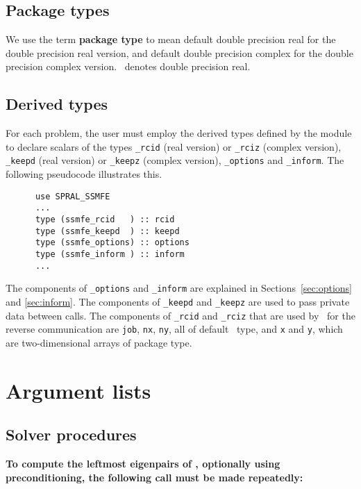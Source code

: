 \documentclass{spral}
\begin{document}
\subsection{Package types} 

We use the term {\bf package type} to mean
default double precision real for the double precision real version,
and default double precision complex
for the double precision complex version. 
\REALDP\
denotes double precision real.

\subsection{Derived types}
\label{derived types}
For each problem, the user must employ the derived types defined by the
module to declare scalars of the types 
{\tt \solver\_rcid} (real version) or 
{\tt \solver\_rciz} (complex version), 
{\tt \solver\_keepd} (real version) or
{\tt \solver\_keepz} (complex version),
{\tt \solver\_options} and 
{\tt \solver\_inform}.
The following pseudocode illustrates this.
\begin{verbatim}
      use SPRAL_SSMFE    
      ...
      type (ssmfe_rcid   ) :: rcid
      type (ssmfe_keepd  ) :: keepd
      type (ssmfe_options) :: options
      type (ssmfe_inform ) :: inform
      ...
\end{verbatim}

The components of 
{\tt \solver\_options} and 
{\tt \solver\_inform} are explained
in Sections~\ref{sec:options} and \ref{sec:inform}. 
The components of {\tt \solver\_keepd} and {\tt \solver\_keepz} 
are used to pass 
private data between calls. 
The components of
{\tt \solver\_rcid} and 
{\tt \solver\_rciz} 
that are used by \fullpackagename\ 
for the reverse communication are
{\tt job},
{\tt nx},
{\tt ny}, all of default \Integer\ type,
and
{\tt x} and {\tt y},
which are 
two-dimensional arrays
of package type.


\section{Argument lists}

\subsection{Solver procedures}

{\bf
To compute %
the leftmost eigenpairs of ,
optionally using preconditioning,
the following call must be made repeatedly:
}
\end{document}
